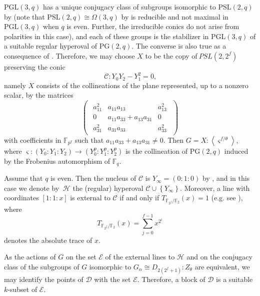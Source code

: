 \documentclass[a4paper,twopage,reqno,12pt]{amsart}
\theoremstyle{definition}
\numberwithin{equation}{section}
\newcommand{\PSL}{\mathrm{PSL}}
\newcommand{\PGL}{\mathrm{PGL}}
\newcommand{\PG}{\mathrm{PG}}
\begin{document}
$\PGL(3,q)$ has a unique conjugacy class of subgroups isomorphic
to $\PSL(2,q)$ by \cite[Table 8.3]{BHRD} (note that $\PSL(2,q) \cong \Omega (3,q)$ by \cite[Corollary 7.14]{Hir} is reducible
and not maximal in $\PGL(3,q)$ when $q$ is even. Further, the irreducible conics do not arise from
polarities in this case), and each of these groups is the stabilizer in $%
\PGL(3,q)$ of a suitable regular hyperoval of $\PG(2,q)$. The converse is also
true as a consequence of \cite[Theorem 7.4]{Hir}. Therefore, we may choose $X$ to be the copy of$\ PSL(2,2^{f})$ preserving the conic 
\begin{equation*}
\mathcal{C}:Y_{0}Y_{2}-Y_{1}^{2}=0\text{,}
\end{equation*}%
namely $X$ consists of the collineations of the plane represented, up to a
nonzero scalar, by the matrices 
\begin{equation*}
\left( 
\begin{array}{ccc}
\begin{array}{ccc}
a_{11}^{2} & a_{11}a_{13} & a_{13}^{2} \\ 
0 & a_{11}a_{33}+a_{13}a_{31} & 0 \\ 
a_{31}^{2} & a_{31}a_{33} & a_{33}^{2}%
\end{array}
\end{array}%
\right) 
\end{equation*}%
with coefficients in $\mathbb{F}_{p^{f}}$ such that $%
a_{11}a_{33}+a_{13}a_{31}\neq 0$. Then $G=X:\left\langle \varsigma
^{f/\theta }\right\rangle $, where $\varsigma
:(Y_{0}:Y_{1}:Y_{2})\longrightarrow (Y_{0}^{p}:Y_{1}^{p}:Y_{2}^{p})$ is the
collineation of $\PG(2,q)$ induced by the Frobenius automorphism of $%
\mathbb{F}_{q}$.

Assume that $q$ is even. Then the nucleus of $\mathcal{C}$ is $Y_{\infty}=(0:1:0)$ by \cite[Corollary 7.12]{Hir}, and in this case we denote by $\ \mathcal{H}$ the (regular) hyperoval $\mathcal{C}\cup \left\{
Y_{\infty}\right\}$. Moreover, a line with coordinates $%
[1:1:x]$ is external to $\mathcal{C}$ if and only if $T_{\mathbb{F}_{2^{f}}/%
\mathbb{F}_{2}}(x)=1$ (e.g. see \cite[Section 1.4(ii.b)]{Hir}), where 
\begin{equation*}
T_{\mathbb{F}_{2^{f}}/\mathbb{F}_{2}}(x)=\sum_{j=0}^{f-1}x^{2^{i}}
\end{equation*}%
denotes the absolute trace of $x$.

As the actions of $G$ on the set $\mathcal{E}$ of the external lines to $\mathcal{H}$ and on
the conjugacy class of the subgroups of $G$ isomorphic to $G_{\alpha }\cong
D_{2(2^{f}+1)}:Z_{\theta }$ are equivalent, we may identify the points of $\mathcal{D%
}$ with the set $\mathcal{E}$. Therefore, a block of $\mathcal{D}$ is a suitable $k$-subset of $\mathcal{E}$. %
\bigskip
\end{document}
